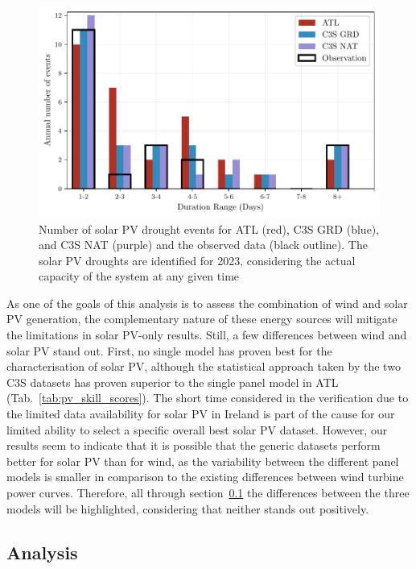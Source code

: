 \documentclass[preprint, 12pt]{elsarticle}
\begin{document}
\begin{figure}[!ht]
	\centering
	\includegraphics[width=\textwidth]{verification_pv_number_events.pdf}
	\caption{Number of solar PV drought events for ATL (red), C3S GRD (blue), and C3S NAT (purple) and the observed data (black outline). The solar PV droughts are identified for 2023, considering the actual capacity of the system at any given time}
	\label{fig:bar_number_events_verification_pv}
\end{figure}

As one of the goals of this analysis is to assess the combination of wind and solar PV generation, the complementary nature of these energy sources will mitigate the limitations in solar PV-only results. Still, a few differences between wind and solar PV stand out. First, no single model has proven best for the characterisation of solar PV, although the statistical approach taken by the two C3S datasets has proven superior to the single panel model in ATL (Tab.~\ref{tab:pv_skill_scores}). The short time considered in the verification due to the limited data availability for solar PV in Ireland is part of the cause for our limited ability to select a specific overall best solar PV dataset. However, our results seem to indicate that it is possible that the generic datasets perform better for solar PV than for wind, as the variability between the different panel models is smaller in comparison to the existing differences between wind turbine power curves. Therefore, all through section~\ref{sec:analysis} the differences between the three models will be highlighted, considering that neither stands out positively.

\subsection{Analysis}
\label{sec:analysis}
\end{document}
